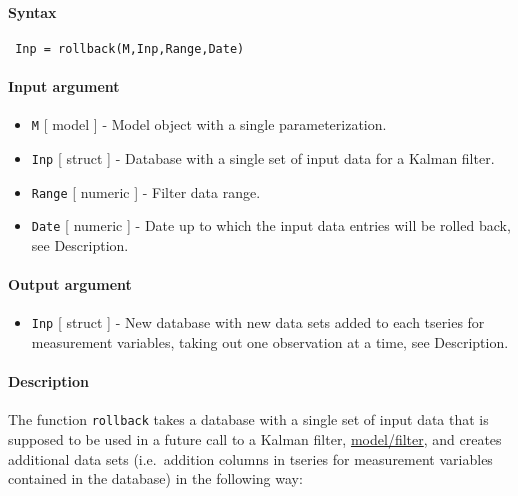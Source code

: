 


	\paragraph{Syntax}
 
 \begin{verbatim}
 Inp = rollback(M,Inp,Range,Date)
 \end{verbatim}
 
 \paragraph{Input argument}
 
 \begin{itemize}
 \item
   \texttt{M} {[} model {]} - Model object with a single
   parameterization.
 \item
   \texttt{Inp} {[} struct {]} - Database with a single set of input data
   for a Kalman filter.
 \item
   \texttt{Range} {[} numeric {]} - Filter data range.
 \item
   \texttt{Date} {[} numeric {]} - Date up to which the input data
   entries will be rolled back, see Description.
 \end{itemize}
 
 \paragraph{Output argument}
 
 \begin{itemize}
 \item
   \texttt{Inp} {[} struct {]} - New database with new data sets added to
   each tseries for measurement variables, taking out one observation at
   a time, see Description.
 \end{itemize}
 
 \paragraph{Description}
 
 The function \texttt{rollback} takes a database with a single set of
 input data that is supposed to be used in a future call to a Kalman
 filter, \url{model/filter}, and creates additional data sets
 (i.e.~addition columns in tseries for measurement variables contained in
 the database) in the following way:
 
